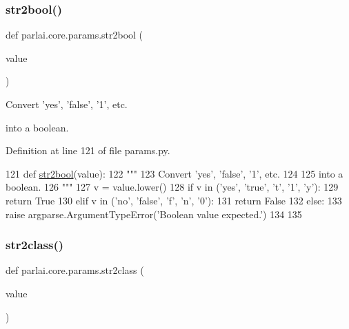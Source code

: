 \subsubsection{\texorpdfstring{str2bool()}{str2bool()}}
{\footnotesize\ttfamily def parlai.\+core.\+params.\+str2bool (\begin{DoxyParamCaption}\item[{}]{value }\end{DoxyParamCaption})}

\begin{DoxyVerb}Convert 'yes', 'false', '1', etc.

into a boolean.
\end{DoxyVerb}
 

Definition at line 121 of file params.\+py.


\begin{DoxyCode}
121 \textcolor{keyword}{def }\hyperlink{namespaceparlai_1_1core_1_1params_a714c9ed20ecfb4f9d524ccbe3510fecc}{str2bool}(value):
122     \textcolor{stringliteral}{"""}
123 \textcolor{stringliteral}{    Convert 'yes', 'false', '1', etc.}
124 \textcolor{stringliteral}{}
125 \textcolor{stringliteral}{    into a boolean.}
126 \textcolor{stringliteral}{    """}
127     v = value.lower()
128     \textcolor{keywordflow}{if} v \textcolor{keywordflow}{in} (\textcolor{stringliteral}{'yes'}, \textcolor{stringliteral}{'true'}, \textcolor{stringliteral}{'t'}, \textcolor{stringliteral}{'1'}, \textcolor{stringliteral}{'y'}):
129         \textcolor{keywordflow}{return} \textcolor{keyword}{True}
130     \textcolor{keywordflow}{elif} v \textcolor{keywordflow}{in} (\textcolor{stringliteral}{'no'}, \textcolor{stringliteral}{'false'}, \textcolor{stringliteral}{'f'}, \textcolor{stringliteral}{'n'}, \textcolor{stringliteral}{'0'}):
131         \textcolor{keywordflow}{return} \textcolor{keyword}{False}
132     \textcolor{keywordflow}{else}:
133         \textcolor{keywordflow}{raise} argparse.ArgumentTypeError(\textcolor{stringliteral}{'Boolean value expected.'})
134 
135 
\end{DoxyCode}
\mbox{\label{namespaceparlai_1_1core_1_1params_aa6083a72ad328d26016bd5f805a0b1c8}} 
\subsubsection{\texorpdfstring{str2class()}{str2class()}}
{\footnotesize\ttfamily def parlai.\+core.\+params.\+str2class (\begin{DoxyParamCaption}\item[{}]{value }\end{DoxyParamCaption})}

